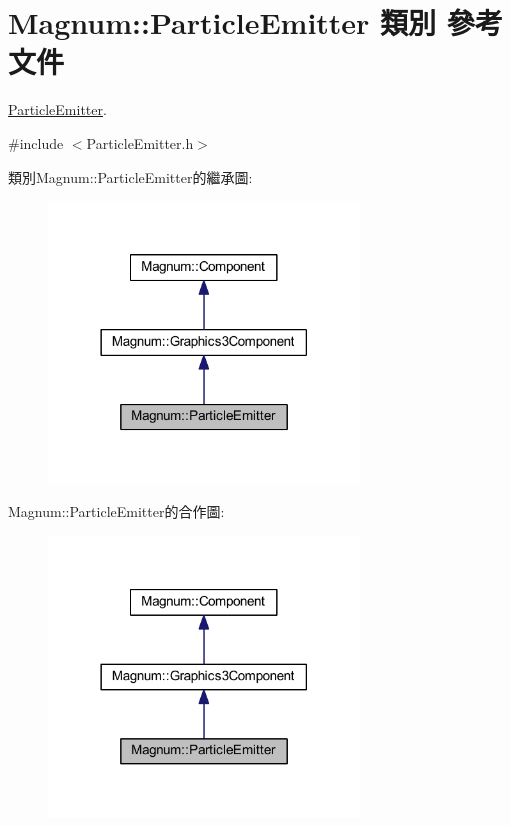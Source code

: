 \hypertarget{class_magnum_1_1_particle_emitter}{}\section{Magnum\+:\+:Particle\+Emitter 類別 參考文件}
\label{class_magnum_1_1_particle_emitter}


\hyperlink{class_magnum_1_1_particle_emitter}{Particle\+Emitter}.  




{\ttfamily \#include $<$Particle\+Emitter.\+h$>$}



類別\+Magnum\+:\+:Particle\+Emitter的繼承圖\+:\nopagebreak
\begin{figure}[H]
\begin{center}
\leavevmode
\includegraphics[width=234pt]{class_magnum_1_1_particle_emitter__inherit__graph}
\end{center}
\end{figure}


Magnum\+:\+:Particle\+Emitter的合作圖\+:\nopagebreak
\begin{figure}[H]
\begin{center}
\leavevmode
\includegraphics[width=234pt]{class_magnum_1_1_particle_emitter__coll__graph}
\end{center}
\end{figure}
